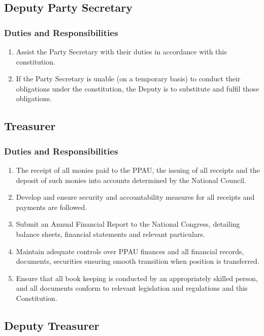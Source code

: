 \documentclass[a4paper,titlepage,8.5pt]{article}
\begin{document}
\subsection{Deputy Party Secretary}

\subsubsection{Duties and Responsibilities}

\begin{enumerate}
\item Assist the Party Secretary with their duties in accordance with this constitution.
\item If the Party Secretary is unable (on a temporary basis) to conduct their obligations under the constitution, the Deputy is to substitute and fulfil those obligations.
\end{enumerate}

\subsection{Treasurer}

\subsubsection{Duties and Responsibilities}

\begin{enumerate}
\item The receipt of all monies paid to the PPAU, the issuing of all receipts and the deposit of such monies into accounts determined by the National Council.
\item Develop and ensure security and accountability measures for all receipts and payments are followed.
\item Submit an Annual Financial Report to the National Congress, detailing balance sheets, financial statements and relevant particulars.
\item Maintain adequate controls over PPAU finances and all financial records, documents, securities ensuring smooth transition when position is transferred.
\item Ensure that all book keeping is conducted by an appropriately skilled person, and all documents conform to relevant legislation and regulations and this Constitution.
\end{enumerate}

\subsection{Deputy Treasurer}
\end{document}
